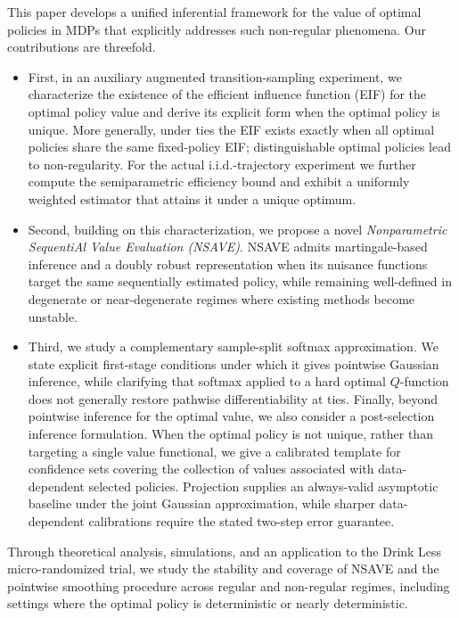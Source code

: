 \documentclass[12pt]{article}
\theoremstyle{remark}\newtheorem{remark}[theorem]{Remark}\theoremstyle{plain}
\begin{document}
This paper develops a unified inferential framework for the value of optimal policies in MDPs that explicitly addresses such non-regular phenomena. 
Our contributions are threefold. 
\begin{itemize}
    \item First, in an auxiliary augmented transition-sampling
    experiment, we characterize the existence of the efficient
    influence function (EIF) for the optimal policy value and derive
    its explicit form when the optimal policy is unique.  More
    generally, under ties the EIF exists exactly when all optimal
    policies share the same fixed-policy EIF; distinguishable optimal
    policies lead to non-regularity.  For the actual i.i.d.-trajectory
    experiment we further compute the semiparametric efficiency bound
    and exhibit a uniformly weighted estimator that attains it under a
    unique optimum.

    \item Second, building on this characterization, we propose a novel \emph{\textit{N}onparametric \textit{S}equenti\textit{A}l \textit{V}alue \textit{E}valuation (NSAVE)}. NSAVE admits martingale-based inference and a doubly robust representation when its nuisance functions target the same sequentially estimated policy, while remaining well-defined in degenerate or near-degenerate regimes where existing methods become unstable.

    \item Third, we study a complementary sample-split softmax approximation.  We state explicit first-stage conditions under which it gives pointwise Gaussian inference, while clarifying that softmax applied to a hard optimal $Q$-function does not generally restore pathwise differentiability at ties.
    Finally, beyond pointwise inference for the optimal value, we also consider a post-selection inference formulation. When the optimal policy is not unique, rather than targeting a single value functional, we give a calibrated template for confidence sets covering the collection of values associated with data-dependent selected policies.  Projection supplies an always-valid asymptotic baseline under the joint Gaussian approximation, while sharper data-dependent calibrations require the stated two-step error guarantee.
\end{itemize}

Through theoretical analysis, simulations, and an application to the
Drink Less micro-randomized trial, we study the stability and coverage of NSAVE and
the pointwise smoothing procedure across regular and non-regular
regimes, including settings where the optimal policy is deterministic
or nearly deterministic.
\end{document}
